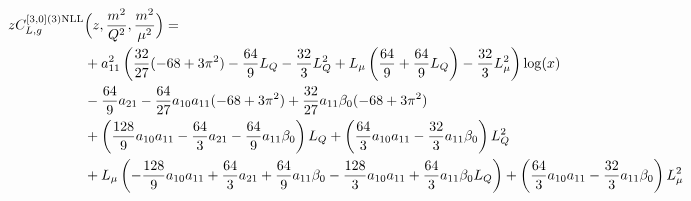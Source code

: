 \documentclass[a4paper]{article}
\begin{document}
\begin{equation}
	\begin{split}
		z C_{L,g}^{[3, 0](3) \rm NLL}&\Bigl(z,\frac{m^2}{Q^2},\frac{m^2}{\mu^2}\Bigr)= \\
		& + a_{11}^2 \left(\frac{32}{27} (-68 + 3 \pi^2) - \frac{64}{9} L_Q - \frac{32}{3} L_Q^2 + L_\mu \left(\frac{64}{9} + \frac{64}{9} L_Q\right)- \frac{32}{3} L_\mu^2\right) \log(x) \\
		& -\frac{64}{9} a_{21} - \frac{64}{27} a_{10} a_{11} (-68 + 3 \pi^2) +  \frac{32}{27} a_{11} \beta_0 (-68 + 3 \pi^2) \\
		&  + \left(\frac{128}{9} a_{10} a_{11} - \frac{64}{3} a_{21} - \frac{64}{9} a_{11} \beta_0\right) L_Q + \left(\frac{64}{3} a_{10} a_{11} - \frac{32}{3} a_{11} \beta_0\right) L_Q^2\\
		& + L_\mu \left(-\frac{128}{9} a_{10} a_{11} + \frac{64}{3} a_{21} + \frac{64}{9} a_{11} \beta_0 - \frac{128}{3} a_{10} a_{11} + \frac{64}{3} a_{11} \beta_0 L_Q\right) + \left(\frac{64}{3} a_{10} a_{11} - \frac{32}{3} a_{11} \beta_0\right) L_\mu^2
	\end{split}
\end{equation}
\end{document}
